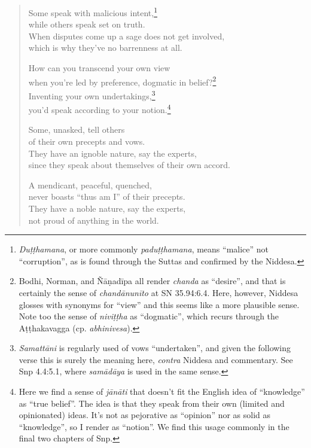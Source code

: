 \documentclass[12pt,openany]{book}%
\begin{document}
\begin{verse}%
Some speak with malicious intent,\footnote{\textit{\textsanskrit{Duṭṭhamana}}, or more commonly \textit{\textsanskrit{paduṭṭhamana}}, means “malice” not “corruption”, as is found through the Suttas and confirmed by the Niddesa. } \\
while others speak set on truth. \\
When disputes come up a sage does not get involved, \\
which is why they’ve no barrenness at all. 

How can you transcend your own view \\
when you’re led by preference, dogmatic in belief?\footnote{Bodhi, Norman, and \textsanskrit{Ñāṇadīpa} all render \textit{chanda} as “desire”, and that is certainly the sense of \textit{\textsanskrit{chandānunīto}} at SN 35.94:6.4. Here, however, Niddesa glosses with synonyms for “view” and this seems like a more plausible sense. Note too the sense of \textit{\textsanskrit{niviṭṭha}} as “dogmatic”, which recurs through the \textsanskrit{Aṭṭhakavagga} (cp. \textit{abhinivesa}). } \\
Inventing your own undertakings,\footnote{\textit{\textsanskrit{Samattāni}} is regularly used of vows “undertaken”, and given the following verse this is surely the meaning here, \emph{contra} Niddesa and commentary. See Snp 4.4:5.1, where \textit{\textsanskrit{samādāya}} is used in the same sense. } \\
you’d speak according to your notion.\footnote{Here we find a sense of \textit{\textsanskrit{jānāti}} that doesn’t fit the English idea of “knowledge” as “true belief”. The idea is that they speak from their own (limited and opinionated) ideas. It’s not as pejorative as “opinion” nor as solid as “knowledge”, so I render as “notion”. We find this usage commonly in the final two chapters of Snp. } 

Some, unasked, tell others \\
of their own precepts and vows. \\
They have an ignoble nature, say the experts, \\
since they speak about themselves of their own accord. 

A mendicant, peaceful, quenched, \\
never boasts “thus am I” of their precepts. \\
They have a noble nature, say the experts, \\
not proud of anything in the world. 


\end{verse}
\end{document}
